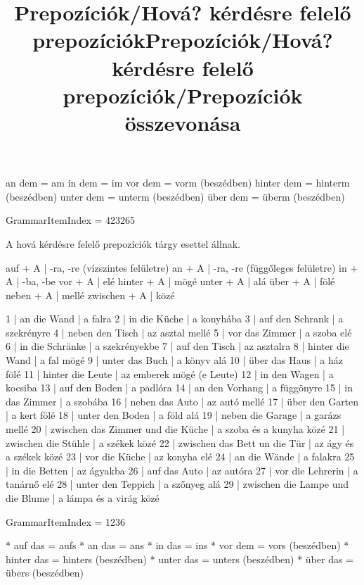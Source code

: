 \begin{desc}
an dem = am
in dem = im
vor dem = vorm (beszédben)
hinter dem = hinterm (beszédben)
unter dem = unterm (beszédben)
über dem = überm (beszédben)
\end{desc}

\begin{exmp}
\end{exmp}

\title{Prepozíciók/Hová? kérdésre felelő prepozíciók}

GrammarItemIndex = 423265

\begin{desc}
A hová kérdésre felelő prepozíciók tárgy esettel állnak.

auf + A      | -ra, -re (vízszintes felületre)
an + A       | -ra, -re (függőleges felületre)
in + A       | -ba, -be
vor + A      | elé
hinter + A   | mögé
unter + A    | alá
über + A     | fölé
neben + A    | mellé
zwischen + A | közé
\end{desc}

\begin{exmp}
1 | an die Wand | a falra
2 | in die Küche | a konyhába
3 | auf den Schrank | a szekrényre
4 | neben den Tisch | az asztal mellé
5 | vor das Zimmer | a szoba elé
6 | in die Schränke | a szekrényekbe
7 | auf den Tisch | az asztalra
8 | hinter die Wand | a fal mögé
9 | unter das Buch | a könyv alá
10 | über das Haus | a ház fölé
11 | hinter die Leute | az emberek mögé (e Leute)
12 | in den Wagen | a kocsiba
13 | auf den Boden | a padlóra
14 | an den Vorhang | a függönyre
15 | in das Zimmer | a szobába
16 | neben das Auto | az autó mellé
17 | über den Garten | a kert fölé
18 | unter den Boden | a föld alá
19 | neben die Garage | a garázs mellé
20 | zwischen das Zimmer und die Küche | a szoba és a kunyha közé
21 | zwischen die Stühle | a székek közé
22 | zwischen das Bett un die Tür | az ágy és a székek közé
23 | vor die Küche | az konyha elé
24 | an die Wände | a falakra
25 | in die Betten | az ágyakba
26 | auf das Auto | az autóra
27 | vor die Lehrerin | a tanárnő elé
28 | unter den Teppich | a szőnyeg alá
29 | zwischen die Lampe und die Blume | a lámpa és a virág közé
\end{exmp}

\title{Prepozíciók/Hová? kérdésre felelő prepozíciók/Prepozíciók összevonása}

GrammarItemIndex = 1236

\begin{desc}
* auf das = aufs
* an das = ans
* in das = ins
* vor dem = vors (beszédben)
* hinter das = hinters (beszédben)
* unter das = unters (beszédben)
* über das = übers (beszédben)
\end{desc}

